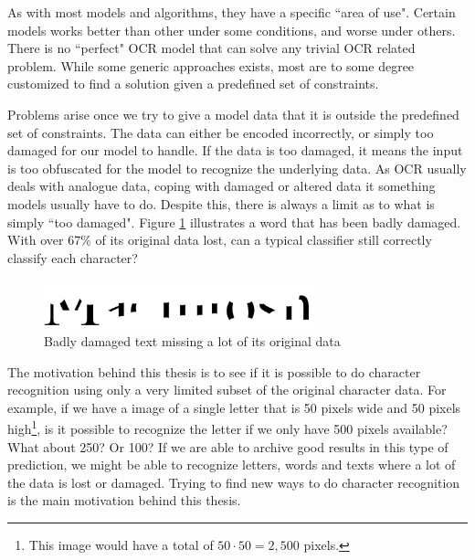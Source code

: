 As with most models and algorithms, they have a specific ``area of use". Certain models works better than other under some conditions, and worse under others. There is no ``perfect" OCR model that can solve any trivial OCR related problem. While some generic approaches exists, most are to some degree customized to find a solution given a predefined set of constraints.

Problems arise once we try to give a model data that it is outside the predefined set of constraints. The data can either be encoded incorrectly, or simply too damaged for our model to handle. If the data is too damaged, it means the input is too obfuscated for the model to recognize the underlying data. As OCR usually deals with analogue data, coping with damaged or altered data it something models usually have to do. Despite this, there is always a limit as to what is simply ``too damaged". Figure \ref{fig:damaged-text} illustrates a word that has been badly damaged. With over 67\% of its original data lost, can a typical classifier still correctly classify each character?

\begin{figure}[ht]
    \centering
    \includegraphics[width=0.7\textwidth]{fig/chapter1/damaged.png}
    \caption{Badly damaged text missing a lot of its original data}
    \label{fig:damaged-text}
\end{figure}

The motivation behind this thesis is to see if it is possible to do character recognition using only a very limited subset of the original character data. For example, if we have a image of a single letter that is 50 pixels wide and 50 pixels high\footnote{This image would have a total of $50 \cdot 50 = 2,500$ pixels.}, is it possible to recognize the letter if we only have 500 pixels available? What about 250? Or 100? If we are able to archive good results in this type of prediction, we might be able to recognize letters, words and texts where a lot of the data is lost or damaged. Trying to find new ways to do character recognition is the main motivation behind this thesis.


